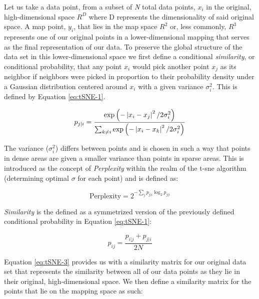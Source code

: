 \noindent \newline Let us take a data point, from a subset of \textit{N} total data points, $x_i$ in the original, high-dimensional space $R^D$ where D represents the dimensionality of said original space. A map point, $y_i$, that lies in the map space $R^2$ or, less commonly, $R^3$ represents one of our original points in a lower-dimensional mapping that serves as the final representation of our data. To preserve the global structure of the data set in this lower-dimensional space we first define a conditional \textit{similarity}, or conditional probability, that any point $x_i$ would pick another point $x_j$ as its neighbor if neighbors were picked in proportion to their probability density under a Gaussian distribution centered around $x_i$ with a given variance $\sigma^2_i$. This is defined by Equation \ref{eq:tSNE-1}.

\begin{equation}
    p_{j|i} = \frac{\exp\left(-\left\lvert x_i - x_j\right\rvert^2 / 2\sigma^2_i\right)}{\sum_{k \neq i} \exp\left(-\left\lvert x_i - x_k\right\rvert^2 / 2\sigma^2_i\right)}
\label{eq:tSNE-1}
\end{equation}

\noindent \newline The variance ($\sigma^2_i$) differs between points and is chosen in such a way that points in dense areas are given a smaller variance than points in sparse areas. This is introduced as the concept of \textit{Perplexity} within the realm of the \gls{t-sne} algorithm (determining optimal $\sigma$ for each point) and is defined as:

\begin{equation}
    \text{Perplexity} = 2^{-\sum_j p_{j|i} \log_2 p_{j|i}}
\label{eq:tSNE-2}
\end{equation}

\noindent \newline \textit{Similarity} is the defined as a symmetrized version of the previously defined conditional probability in Equation \ref{eq:tSNE-1}:

\begin{equation}
    p_{ij} = \frac{p_{i|j} + p_{j|i}}{2N}
\label{eq:tSNE-3}
\end{equation}

\noindent \newline Equation \ref{eq:tSNE-3} provides us with a similarity matrix for our original data set that represents the similarity between all of our data points as they lie in their original, high-dimensional space. We then define a similarity matrix for the points that lie on the mapping space as such:

